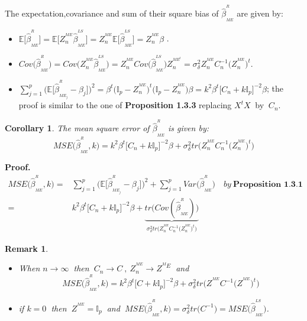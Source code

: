 \documentclass[12pt]{report}
\newtheorem{remarque}{Remark}[section]
\newtheorem{corollaire}{Corollary}
\begin{document}
The expectation,covariance and sum of their square bias of $\hat{\beta}^{^{R}}_{_{ME}}$ are given by:
\begin{itemize}
	\item $\mathbb{E}\big[\hat{\beta}^{^{R}}_{_{ME}}\big]=\mathbb{E}\big[Z^{^{ME}}_{n}\hat{\beta}^{^{LS}}_{_{ME}}\big]=Z^{^{ME}}_{n}\mathbb{E}\big[\hat{\beta}^{^{LS}}_{_{ME}}\big]=Z^{^{ME}}_{n}\beta$ .
	\item $Cov\big(\hat{\beta}^{^{R}}_{_{ME}}\big)=Cov\big(Z^{^{ME}}_{n}\hat{\beta}^{^{LS}}_{_{ME}}\big)=Z^{^{ME}}_{n}Cov\big(\hat{\beta}^{^{LS}}_{_{ME}}\big)Z^{^{ME^{t}}}_{n}=\sigma_{\delta}^{2}Z^{^{ME}}_{n}C_{n}^{-1}\big(Z^{^{ME}}_{n}\big)^{t}$.
	\item $\sum_{j=1}^{p}\big(\mathbb{E}\big[\hat{\beta}^{^{R}}_{_{ME_{j}}}-\beta_{j}\big]\big)^{2}=\beta^{t}\big(\mathbb{I}_{p}-Z^{^{ME}}_{n}\big)^{t}\big(\mathbb{I}_{p}-Z^{^{ME}}_{n}\big)\beta=k^{2}\beta^{t}\big[C_{n}+k\mathbb{I}_{p}\big]^{-2}\beta$; the proof is similar to the one of \textbf{Proposition 1.3.3} replacing $X^{t}X\ $ by $\ C_{n}$.
\end{itemize}
\begin{corollaire}
	The mean square error of $\hat{\beta}^{^{R}}_{_{ME}}$ is given by:
	\begin{equation}
	MSE\big(\hat{\beta}^{^{R}}_{_{ME}},k\big)=k^{2}\beta^{t}\big[C_{n}+k\mathbb{I}_{p}\big]^{-2}\beta+\sigma_{\delta}^{2} tr\big(Z^{^{ME}}_{n}C_{n}^{-1}\big(Z^{^{ME}}_{n}\big)^{t}\big)
	\end{equation}
\end{corollaire}
\textbf{Proof.}
\begin{align*}
	MSE\big(\hat{\beta}^{^{R}}_{_{ME}},k\big)=&\sum_{j=1}^{p}\big(\mathbb{E}\big[\hat{\beta}^{^{R}}_{_{ME_{j}}}-\beta_{j}\big]\big)^{2}+\sum_{j=1}^{p}Var\big(\hat{\beta}^{^{R}}_{_{ME}}\big)\quad   by\ \textbf{Proposition 1.3.1} \\
	=& k^{2}\beta^{t}\big[C_{n}+k\mathbb{I}_{p}\big]^{-2}\beta+ \underbrace{tr\big(Cov(\hat{\beta}^{^{R}}_{_{ME}})\big)}_{\sigma_{\delta}^{2}tr\big(Z^{^{ME}}_{n}C_{n}^{-1}\big(Z^{^{ME}}_{n}\big)^{t} \big)}
\end{align*}
\begin{remarque}
\begin{itemize}
\item	When $n\rightarrow \infty\ $ then $\ C_{n}\rightarrow C\ , \ Z^{^{ME}}_{n}\rightarrow Z^{^ME}\  $ and  $$	MSE\big(\hat{\beta}^{^{R}}_{_{ME}},k\big)=k^{2}\beta^{t}\big[C+k\mathbb{I}_{p}\big]^{-2}\beta+\sigma_{\delta}^{2} tr\big(Z^{^{ME}}C^{-1}\big(Z^{^{ME}}\big)^{t}\big)$$
\item if $k=0\ $ then $\ Z^{^{ME}}=\mathbb{I}_{p}\ $ and $\ MSE\big(\hat{\beta}^{^{R}}_{_{ME}},k\big)=\sigma_{\delta}^{2}tr\big(C^{-1}\big)=MSE\big(\hat{\beta}^{^{LS}}_{_{ME}}\big)$.
\end{itemize}
\end{remarque}
\end{document}
